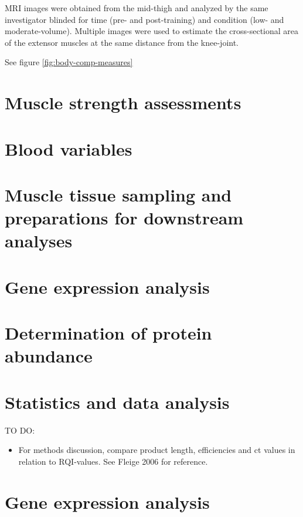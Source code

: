 \documentclass[twoside,10pt]{gihclass} %
\providecommand{\tightlist}{%
  \setlength{\itemsep}{0pt}\setlength{\parskip}{0pt}}
\begin{document}
MRI images were obtained from the mid-thigh and analyzed by the same investigator blinded for time (pre- and post-training) and condition (low- and moderate-volume). Multiple images were used to estimate the cross-sectional area of the extensor muscles at the same distance from the knee-joint.

See figure \ref{fig:body-comp-measures}

\hypertarget{muscle-strength-assessments}{%
\section{Muscle strength assessments}\label{muscle-strength-assessments}}

\hypertarget{blood-variables}{%
\section{Blood variables}\label{blood-variables}}

\hypertarget{muscle-tissue-sampling-and-preparations-for-downstream-analyses}{%
\section{Muscle tissue sampling and preparations for downstream analyses}\label{muscle-tissue-sampling-and-preparations-for-downstream-analyses}}

\hypertarget{gene-expression-analysis}{%
\section{Gene expression analysis}\label{gene-expression-analysis}}

\hypertarget{determination-of-protein-abundance}{%
\section{Determination of protein abundance}\label{determination-of-protein-abundance}}

\hypertarget{statistics-and-data-analysis}{%
\section{Statistics and data analysis}\label{statistics-and-data-analysis}}

TO DO:
\begin{itemize}
\tightlist
\item
  For methods discussion, compare product length, efficiencies and ct values in relation to RQI-values. See Fleige 2006 for reference.
\end{itemize}
\hypertarget{gene-expression-analysis-1}{%
\section{Gene expression analysis}\label{gene-expression-analysis-1}}
\end{document}
